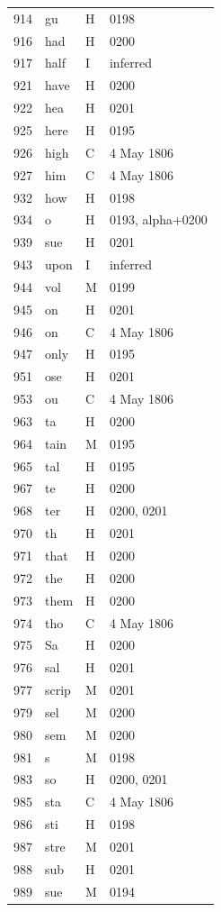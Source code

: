 \begin{longtable}{@{}rlll@{}}
914 & gu & H & 0198 \\
916 & had & H & 0200 \\
917 & half & I & inferred \\
921 & have & H & 0200 \\
922 & hea & H & 0201 \\
925 & here & H & 0195 \\
926 & high & C & 4 May 1806 \\
927 & him & C & 4 May 1806 \\
932 & how & H & 0198 \\
934 & o & H & 0193, alpha+0200 \\
939 & sue & H & 0201 \\
943 & upon & I & inferred \\
944 & vol & M & 0199 \\
945 & on & H & 0201 \\
946 & on & C & 4 May 1806 \\
947 & only & H & 0195 \\
951 & ose & H & 0201 \\
953 & ou & C & 4 May 1806 \\
963 & ta & H & 0200 \\
964 & tain & M & 0195 \\
965 & tal & H & 0195 \\
967 & te & H & 0200 \\
968 & ter & H & 0200, 0201 \\
970 & th & H & 0201 \\
971 & that & H & 0200 \\
972 & the & H & 0200 \\
973 & them & H & 0200 \\
974 & tho & C & 4 May 1806 \\
975 & Sa & H & 0200 \\
976 & sal & H & 0201 \\
977 & scrip & M & 0201 \\
979 & sel & M & 0200 \\
980 & sem & M & 0200 \\
981 & s & M & 0198 \\
983 & so & H & 0200, 0201 \\
985 & sta & C & 4 May 1806 \\
986 & sti & H & 0198 \\
987 & stre & M & 0201 \\
988 & sub & H & 0201 \\
989 & sue & M & 0194 \\

\end{longtable}
